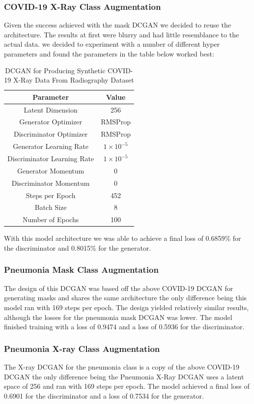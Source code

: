 \subsubsection{COVID-19 X-Ray Class Augmentation}
Given the success achieved with the mask DCGAN we decided to reuse the architecture.  The results at first were blurry and had little resemblance to the actual data.  we decided to experiment with a number of different hyper parameters and found the parameters in the table below worked best:
\begin{table}[H]
    \centering
    \begin{tabular}{|c|c|}
    \hline
        Parameter
        & Value\\
         \hline
          Latent Dimension & 256\\
          Generator Optimizer & RMSProp \\
          Discriminator Optimizer & RMSProp\\
          Generator Learning Rate & $1\times10^{-5}$\\
          Discriminator Learning Rate & $1\times10^{-5}$\\
          Generator Momentum & 0\\
          Discriminator Momentum & 0\\
          Steps per Epoch & 452\\
          Batch Size & 8\\
          Number of Epochs & 100\\
         \hline
    \end{tabular}
    \caption{DCGAN for Producing Synthetic COVID-19 X-Ray Data From Radiography Dataset }
    \label{tab:DCGAN for Producing Synthetic COVID-19 X-Ray Data From Radiography Dataset}
\end{table}
With this model architecture we was able to achieve a final loss of 0.6859\% for the discriminator and 0.8015\% for the generator.
\subsubsection{Pneumonia Mask Class Augmentation}
The design of this DCGAN was based off the above COVID-19 DCGAN for generating masks and shares the same architecture the only difference being this model ran with 169 steps per epoch. The design yielded relatively similar results, although the losses for the pneumonia mask DCGAN was lower.  The model finished training with a loss of 0.9474 and a loss of 0.5936 for the discriminator.
\subsubsection{Pneumonia X-ray Class Augmentation}
The X-ray DCGAN for the pneumonia class is a copy of the above COVID-19 DCGAN the only difference being the Pneumonia X-Ray DCGAN uses a latent space of 256 and ran with 169 steps per epoch.  The model achieved a final loss of 0.6901 for the discriminator and a loss of 0.7534 for the generator.
